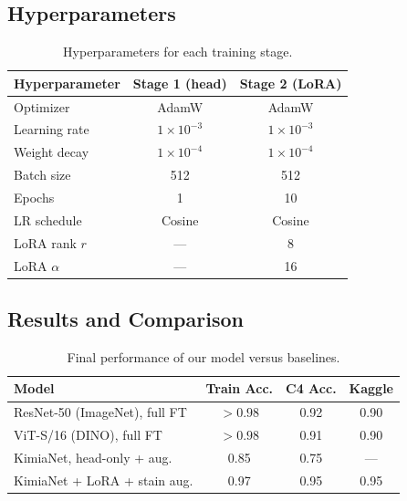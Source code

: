 \documentclass{midl}
\begin{document}
\subsection{Hyperparameters}

\begin{table}[H]
    \centering
    \small
    \caption{Hyperparameters for each training stage.}
    \label{tab:hyperparams}
    \begin{tabular}{lcc}
        \toprule
        \textbf{Hyperparameter} & \textbf{Stage 1 (head)} & \textbf{Stage 2 (LoRA)} \\
        \midrule
        Optimizer        & AdamW               & AdamW \\
        Learning rate    & $1\times10^{-3}$    & $1\times10^{-3}$ \\
        Weight decay     & $1\times10^{-4}$    & $1\times10^{-4}$ \\
        Batch size       & 512                 & 512 \\
        Epochs           & 1                   & 10 \\
        LR schedule      & Cosine              & Cosine \\
        LoRA rank $r$    & ---                 & 8 \\
        LoRA $\alpha$    & ---                 & 16 \\
        \bottomrule
    \end{tabular}
\end{table}

\subsection{Results and Comparison}

\begin{table}[H]
    \centering
    \small
    \caption{Final performance of our model versus baselines.}
    \label{tab:results}
    \begin{tabular}{lccc}
        \toprule
        \textbf{Model} & \textbf{Train Acc.} & \textbf{C4 Acc.} & \textbf{Kaggle} \\
        \midrule
        ResNet-50 (ImageNet), full FT      & $>0.98$ & 0.92 & 0.90 \\
        ViT-S/16 (DINO), full FT           & $>0.98$ & 0.91 & 0.90 \\
        KimiaNet, head-only + aug.         & 0.85    & 0.75 & ---  \\
        KimiaNet + LoRA + stain aug.       & 0.97    & 0.95 & 0.95 \\
        \bottomrule
    \end{tabular}
\end{table}
\end{document}
